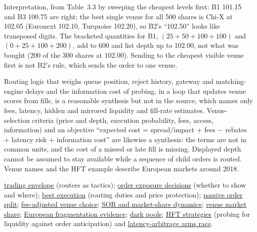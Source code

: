 \begin{qfdefinition}
 Interpretation, from Table~3.3 by sweeping the cheapest levels first: B1 101.15 and B3 100.75 are right; the best single venue for all 500 shares is Chi-X at 102.05 (Euronext 102.10, Turquoise 102.20), so B2's ``102.50'' looks like transposed digits. The bracketed quantities for B1, $(25+50+100+100)$ and $(0+25+100+200)$, add to 600 and list depth up to 102.00, not what was bought (200 of the 300 shares at 102.00). Sending to the cheapest visible venue first is not B2's rule, which sends the order to one venue.

Routing logic that weighs queue position, reject history, gateway and matching-engine delays and the information cost of probing, in a loop that updates venue scores from fills, is a reasonable synthesis but not in the source, which names only fees, latency, hidden and mirrored liquidity and fill-rate estimates. Venue-selection criteria (price and depth, execution probability, fees, access, information) and an objective ``expected cost = spread/impact + fees $-$ rebates + latency risk + information cost'' are likewise a synthesis: the terms are not in common units, and the cost of a missed or late fill is missing. Displayed depth cannot be assumed to stay available while a sequence of child orders is routed. Venue names and the HFT example describe European markets around 2018.

 \hyperref[def:trading-envelope]{trading envelope} (routers as tactics); \hyperref[def:order-exposure-decisions]{order exposure decisions} (whether to show and where); \hyperref[def:best-execution]{best execution} (routing duties and price protection); \hyperref[meth:passive-order-split]{passive order split}; \hyperref[res:fee-adjusted-venue-choice]{fee-adjusted venue choice}; \hyperref[mod:sor-market-share-dynamics]{SOR and market-share dynamics}; \hyperref[meth:venue-market-share]{venue market share}; \hyperref[ev:european-fragmentation-evidence]{European fragmentation evidence}; \hyperref[def:dark-pools-crossing]{dark pools}; \hyperref[def:hft-strategies]{HFT strategies} (probing for liquidity against order anticipation) and \hyperref[res:latency-arbitrage-arms-race]{latency-arbitrage arms race}.

\end{qfdefinition}

